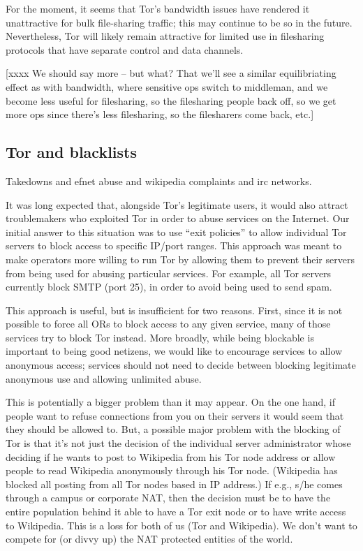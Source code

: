 \documentclass{llncs}
\begin{document}
For the moment, it seems that Tor's bandwidth issues have rendered it
unattractive for bulk file-sharing traffic; this may continue to be so in the
future.  Nevertheless, Tor will likely remain attractive for limited use in
filesharing protocols that have separate control and data channels.

[xxxx We should say more -- but what?  That we'll see a similar
  equilibriating effect as with bandwidth, where sensitive ops switch to
  middleman, and we become less useful for filesharing, so the filesharing
  people back off, so we get more ops since there's less filesharing, so the
  filesharers come back, etc.]


\subsection{Tor and blacklists}

Takedowns and efnet abuse and wikipedia complaints and irc
networks.

It was long expected that, alongside Tor's legitimate users, it would also
attract troublemakers who exploited Tor in order to abuse services on the
Internet.  Our initial answer to this situation was to use ``exit policies''
to allow individual Tor servers to block access to specific IP/port ranges.
This approach was meant to make operators more willing to run Tor by allowing
them to prevent their servers from being used for abusing particular
services.  For example, all Tor servers currently block SMTP (port 25), in
order to avoid being used to send spam.

This approach is useful, but is insufficient for two reasons.  First, since
it is not possible to force all ORs to block access to any given service,
many of those services try to block Tor instead.  More broadly, while being
blockable is important to being good netizens, we would like to encourage
services to allow anonymous access; services should not need to decide
between blocking legitimate anonymous use and allowing unlimited abuse.

This is potentially a bigger problem than it may appear. 
On the one hand, if people want to refuse connections from you on
their servers it would seem that they should be allowed to.  But, a
possible major problem with the blocking of Tor is that it's not just
the decision of the individual server administrator whose deciding if
he wants to post to Wikipedia from his Tor node address or allow
people to read Wikipedia anonymously through his Tor node. (Wikipedia
has blocked all posting from all Tor nodes based in IP address.) If e.g.,
s/he comes through a campus or corporate NAT, then the decision must
be to have the entire population behind it able to have a Tor exit
node or to have write access to Wikipedia. This is a loss for both of us (Tor
and Wikipedia). We don't want to compete for (or divvy up) the NAT
protected entities of the world.
\end{document}
